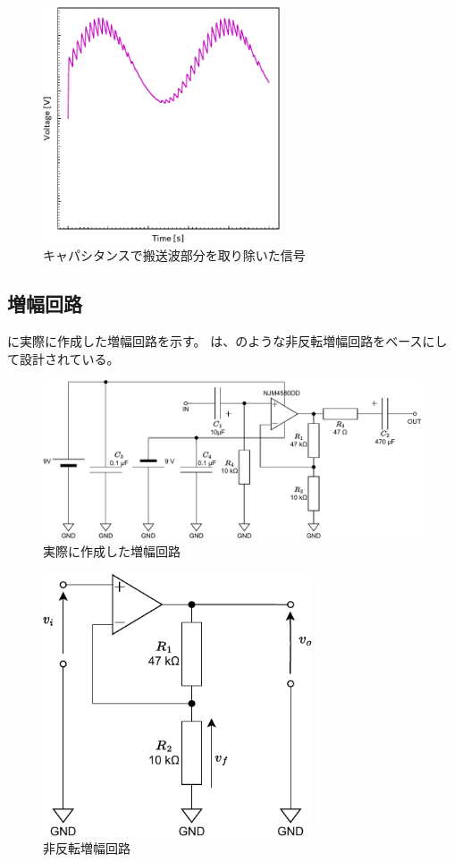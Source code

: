 \documentclass[report.tex]{subfiles}
\begin{document}
\begin{figure}[H]
	\centering
	\includegraphics[width=7cm]{fig/capa.pdf}
	\caption{キャパシタンスで搬送波部分を取り除いた信号}
	\label{fig:capa}
\end{figure}

\subsection{増幅回路}

に実際に作成した増幅回路を示す。
は、のような非反転増幅回路をベースにして設計されている。

\begin{figure}[H]
	\centering
	\includegraphics[width=15cm]{fig/amp.pdf}
	\caption{実際に作成した増幅回路}
	\label{fig:amplifier-circuit}
\end{figure}

\begin{figure}[H]
	\centering
	\includegraphics[width=8cm]{fig/amp2.pdf}
	\caption{非反転増幅回路}
	\label{fig:amplifier-circuit2}
\end{figure}
\end{document}
